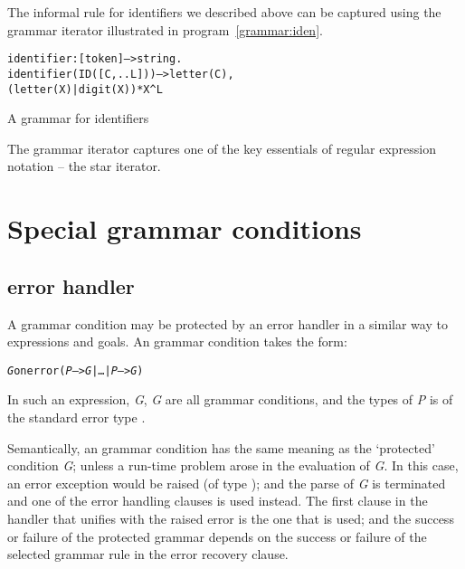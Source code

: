 The informal rule for identifiers we described above can be captured using the grammar iterator illustrated in program~\vref{grammar:iden}.
\begin{program}
\vspace{0.5ex}
\begin{alltt}
identifier:[token]-->string.
identifier(ID([C,..L])) --> letter(C),
      (letter(X)|digit(X))*X^L
\end{alltt}
\vspace{-2ex}
\caption{A grammar for identifiers}\label{grammar:iden}
\end{program}

\begin{aside}
The grammar iterator captures one of the key essentials of regular expression notation -- the star iterator. 
\end{aside}

\section{Special grammar conditions}

\subsection{error handler}
\label{grammar:errorhandler}

A grammar condition may be protected by an error handler in a similar way to expressions and goals. An  grammar condition takes the form:

\begin{alltt}
\emph{G} onerror (\emph{P} --> \emph{G} | \ldots{} | \emph{P\subn} --> \emph{G\subn})
\end{alltt}
In such an expression, \emph{G}, \emph{G\subi} are all grammar conditions, and the types of \emph{P\subi} is of the standard error type .

Semantically, an  grammar condition has the same meaning as the `protected' condition \emph{G}; unless a run-time problem arose in the evaluation of \emph{G}. In this case, an error exception would be raised (of type ); and the parse of \emph{G} is terminated and one of the error handling clauses is used instead. The first clause in the handler that unifies with the raised error is the one that is used; and the success or failure of the protected grammar depends on the success or failure of the selected grammar rule in the error recovery clause.

